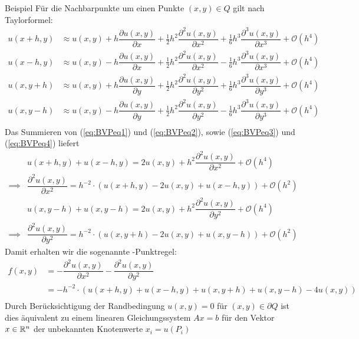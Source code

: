 \begin{colboxBreakable}{Beispiel}
  Für die Nachbarpunkte um einen Punkte $(x,y)\in Q$ gilt nach Taylorformel:
  \begin{align*}
    u(x+h,y) 
    & \approx u(x,y) + h \dfrac{\partial u(x,y)}{\partial x} 
    + \tfrac{1}{2} h^2 \dfrac{\partial^2 u(x,y)}{\partial x^2} 
    + \tfrac{1}{6} h^3 \dfrac{\partial^3 u(x,y)}{\partial x^3} + \mathcal{O}(h^4) 
    \tag{1}\label{eq:BVPeq1} \\
    u(x-h,y) 
    & \approx u(x,y) - h \dfrac{\partial u(x,y)}{\partial x} 
    + \tfrac{1}{2} h^2 \dfrac{\partial^2 u(x,y)}{\partial x^2} 
    - \tfrac{1}{6} h^3 \dfrac{\partial^3 u(x,y)}{\partial x^3} + \mathcal{O}(h^4) 
    \tag{2}\label{eq:BVPeq2} \\
    u(x,y+h) 
    & \approx u(x,y) + h \dfrac{\partial u(x,y)}{\partial y} 
    + \tfrac{1}{2} h^2 \dfrac{\partial^2 u(x,y)}{\partial y^2} 
    + \tfrac{1}{6} h^3 \dfrac{\partial^3 u(x,y)}{\partial y^3} + \mathcal{O}(h^4) 
    \tag{3}\label{eq:BVPeq3} \\
    u(x,y-h) 
    & \approx u(x,y) - h \dfrac{\partial u(x,y)}{\partial y} 
    + \tfrac{1}{2} h^2 \dfrac{\partial^2 u(x,y)}{\partial y^2} 
    - \tfrac{1}{6} h^3 \dfrac{\partial^3 u(x,y)}{\partial y^3} + \mathcal{O}(h^4) 
    \tag{4}\label{eq:BVPeq4} \\
  \end{align*}
  Das Summieren von (\ref{eq:BVPeq1}) und (\ref{eq:BVPeq2}), sowie (\ref{eq:BVPeq3}) und (\ref{eq:BVPeq4}) liefert
  \begin{align*}
    & u(x+h,y) + u(x-h,y) = 2u(x,y) + h^2\dfrac{\partial^2 u(x,y)}{\partial x^2} + \mathcal{O}(h^4) \\
    \implies& \dfrac{\partial^2 u(x,y)}{\partial x^2} = h^{-2}\cdot\left(u(x+h,y) - 2u(x,y) + u(x-h,y)\right) 
    + \mathcal{O}(h^2)\\
    & u(x,y-h) + u(x,y-h) = 2u(x,y) + h^2\dfrac{\partial^2 u(x,y)}{\partial y^2} + \mathcal{O}(h^4) \\
    \implies& \dfrac{\partial^2 u(x,y)}{\partial y^2} = h^{-2}\cdot\left(u(x,y+h) - 2u(x,y) + u(x,y-h)\right)
    + \mathcal{O}(h^2)
  \end{align*}
  Damit erhalten wir die sogenannte -Punktregel\grqq{}: 
  \begin{align*}
    f(x,y) 
    &= - \dfrac{\partial^2 u(x,y)}{\partial x^2} - \dfrac{\partial^2 u(x,y)}{\partial y^2} \\
    &= -h^{-2}\cdot\left(u(x+h,y) + u(x-h,y) + u(x,y+h) + u(x,y-h) - 4u(x,y)\right) \\
  \end{align*}
  Durch Berücksichtigung der Randbedingung $u(x,y)=0$ für $(x,y)\in\partial Q$ ist dies äquivalent zu einem 
  linearen Gleichungssystem $Ax=b$ für den Vektor $x\in\mathbb R^n$ der unbekannten Knotenwerte $x_i=u(P_i)$
  

\end{colboxBreakable}
